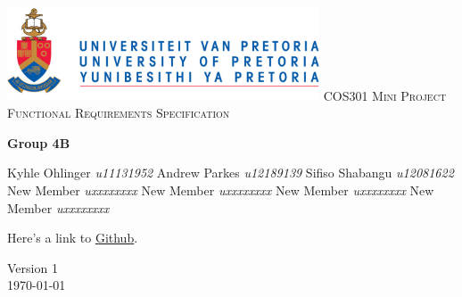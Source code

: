\begin{titlepage}
\begin{center}
\includegraphics[width=350px]{University_of_Pretoria_Logo.png}\newline
\textsc{\LARGE COS301 Mini Project Functional Requirements Specification}\newline


\textbf{Group 4B} \\
\begin{flushright} \large
Kyhle Ohlinger \emph{u11131952} \newline
Andrew Parkes \emph{u12189139} \newline
Sifiso Shabangu \emph{u12081622} \newline
New Member \emph{uxxxxxxxx} \newline
New Member \emph{uxxxxxxxx} \newline
New Member \emph{uxxxxxxxx} \newline
New Member \emph{uxxxxxxxx} \newline \newline \newline
\end{flushright}
Here's a link to \href{https://github.com/KyhleOhlinger/COS301-Group-4_B.git}{Github}.


\vfill

{\large Version 1}
\\
{\large \today}

\end{center}
\end{titlepage}
